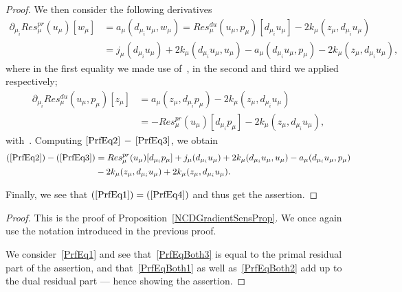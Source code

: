\begin{proof}
    We then consider the following derivatives
    \begin{align}
        \partial_{\mu_i} Res_\mu^{pr}(u_\mu)[w_\mu] &= a_\mu(d_{\mu_i} u_\mu, w_\mu) = Res_\mu^{du}(u_\mu, p_\mu)[d_{\mu_i} u_\mu] - 2 k_\mu(z_\mu, d_{\mu_i} u_\mu) \label{PrfEq2}\\
        &= j_\mu(d_{\mu_i} u_\mu) + 2 k_\mu(d_{\mu_i} u_\mu, u_\mu) - a_\mu(d_{\mu_i} u_\mu, p_\mu) - 2 k_\mu(z_\mu, d_{\mu_i} u_\mu), \nonumber
    \end{align}
    where in the first equality we made use of~\cite[Proposition 2.5]{Keil2021}, in the second and third we applied~\cite[Equation 3.11 and 2.5]{Keil2021} respectively;
    \begin{align}
        \partial_{\mu_i} Res_\mu^{du}(u_\mu, p_\mu)[z_\mu] &= a_\mu(z_\mu, d_{\mu_i} p_\mu) - 2 k_\mu(z_\mu, d_{\mu_i} u_\mu) \label{PrfEq3}\\
        &= - Res_\mu^{pr}(u_\mu)[d_{\mu_i} p_\mu] - 2 k_\mu(z_\mu, d_{\mu_i} u_\mu), \nonumber
    \end{align}
    with~\cite[Equation 2.6 and 3.10]{Keil2021}.
    Computing $\eqref{PrfEq2}\,-\,\eqref{PrfEq3}$, we obtain
    \begin{align}
        (\ref{PrfEq2}) - (\ref{PrfEq3}) &= Res_\mu^{pr}(u_\mu)[d_{\mu_i} p_\mu] + j_\mu(d_{\mu_i} u_\mu) + 2 k_\mu(d_{\mu_i} u_\mu, u_\mu) - a_\mu(d_{\mu_i} u_\mu, p_\mu) \label{PrfEq4}\\
        &- 2 k_\mu(z_\mu, d_{\mu_i} u_\mu) + 2 k_\mu(z_\mu, d_{\mu_i} u_\mu). \nonumber
    \end{align}

    Finally, we see that $(\ref{PrfEq1}) = (\ref{PrfEq4})$ and thus get the assertion.
\end{proof}

\begin{proof}
    This is the proof of Proposition~\ref{NCDGradientSensProp}.
    We once again use the notation introduced in the previous proof.
    
    We consider~\eqref{PrfEq1} and see that~\eqref{PrfEqBoth3} is equal to the primal residual part of the assertion, and that~\eqref{PrfEqBoth1} as well as~\eqref{PrfEqBoth2} add up to the dual residual part --- hence showing the assertion.
\end{proof}

